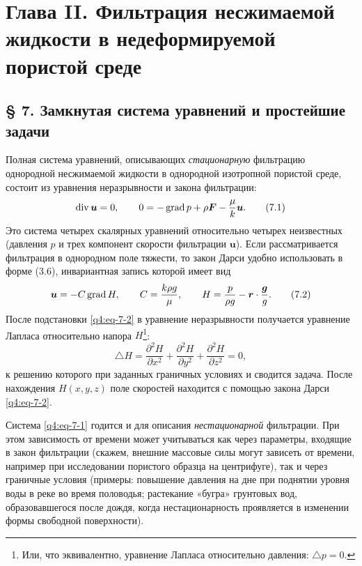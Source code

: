 \section*{Глава II. Фильтрация несжимаемой жидкости в недеформируемой пористой среде}
\label{q4:chapter-ii}
\subsection*{§ 7. Замкнутая система уравнений и простейшие задачи}
\label{q4:sec-7}
\setcounter{footnote}{0}
Полная система уравнений, описывающих \textit{стационарную} фильтрацию однородной несжимаемой жидкости в однородной изотропной пористой среде, состоит из уравнения неразрывности и закона фильтрации:
\begin{equation}
\operatorname{div}\boldsymbol{u}=0,\qquad 0=-\operatorname{grad} p+\rho\boldsymbol{F}-\frac{\mu}{k}\boldsymbol{u}.
\tag{7.1}\label{q4:eq-7-1}
\end{equation}
Это система четырех скалярных уравнений относительно четырех неизвестных (давления $p$ и трех компонент скорости фильтрации $\boldsymbol{u}$). Если рассматривается фильтрация в однородном поле тяжести, то закон Дарси удобно использовать в форме (3.6), инвариантная запись которой имеет вид
\begin{equation}
\boldsymbol{u}=-C\operatorname{grad} H,\qquad C=\frac{k\rho g}{\mu},\qquad H=\frac{p}{\rho g}-\boldsymbol{r}\cdot\frac{\boldsymbol{g}}{g}.
\tag{7.2}\label{q4:eq-7-2}
\end{equation}
После подстановки \eqref{q4:eq-7-2} в уравнение неразрывности получается уравнение Лапласа относительно напора $H$\footnote{Или, что эквивалентно, уравнение Лапласа относительно давления: $\triangle p=0$.}:
\begin{equation}
\triangle H=\frac{\partial^2H}{\partial x^2}+\frac{\partial^2H}{\partial y^2}+\frac{\partial^2H}{\partial z^2}=0,
\tag{7.3}\label{q4:eq-7-3}
\end{equation}
к решению которого при заданных граничных условиях и сводится задача. После нахождения $H(x,y,z)$ поле скоростей находится с помощью закона Дарси \eqref{q4:eq-7-2}.

Система \eqref{q4:eq-7-1} годится и для описания \textit{нестационарной} фильтрации. При этом зависимость от времени может учитываться как через параметры, входящие в закон фильтрации (скажем, внешние массовые силы могут зависеть от времени, например при исследовании пористого образца на центрифуге), так и через граничные условия (примеры: повышение давления на дне при поднятии уровня воды в реке во время половодья; растекание «бугра» грунтовых вод, образовавшегося после дождя, когда нестационарность проявляется в изменении формы свободной поверхности).

